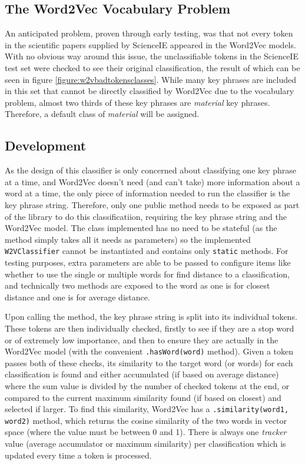 \subsection{The Word2Vec Vocabulary Problem}
An anticipated problem, proven through early testing, was that not every token in the scientific papers supplied by ScienceIE appeared in the Word2Vec models. With no obvious way around this issue, the unclassifiable tokens in the ScienceIE test set were checked to see their original classification, the result of which can be seen in figure \ref{figure:w2vbadtokensclasses}. While many key phrases are included in this set that cannot be directly classified by Word2Vec due to the vocabulary problem, almost two thirds of these key phrases are \textit{material} key phrases. Therefore, a default class of \textit{material} will be assigned.

\subsection{Development}
As the design of this classifier is only concerned about classifying one key phrase at a time, and Word2Vec doesn't need (and can't take) more information about a word at a time, the only piece of information needed to run the classifier is the key phrase string. Therefore, only one public method needs to be exposed as part of the library to do this classificatiion, requiring the key phrase string and the Word2Vec model. The class implemented has no need to be stateful (as the method simply takes all it needs as parameters) so the implemented \texttt{W2VClassifier} cannot be instantiated and contains only \texttt{static} methods. For testing purposes, extra parameters are able to be passed to configure items like whether to use the single or multiple words for find distance to a classification, and technically two methods are exposed to the word as one is for closest distance and one is for average distance.

Upon calling the method, the key phrase string is split into its individual tokens. These tokens are then individually checked, firstly to see if they are a stop word or of extremely low importance, and then to ensure they are actually in the Word2Vec model (with the convenient \texttt{.hasWord(word)} method). Given a token passes both of these checks, its similarity to the target word (or words) for each classification is found and either accumulated (if based on average distance) where the sum value is divided by the number of checked tokens at the end, or compared to the current maximum similarity found (if based on closest) and selected if larger. To find this similarity, Word2Vec has a \texttt{.similarity(word1, word2)} method, which returns the cosine similarity of the two words in vector space (where the value must be between 0 and 1). There is always one \textit{tracker} value (average accumulator or maximum similarity) per classification which is updated every time a token is processed.

